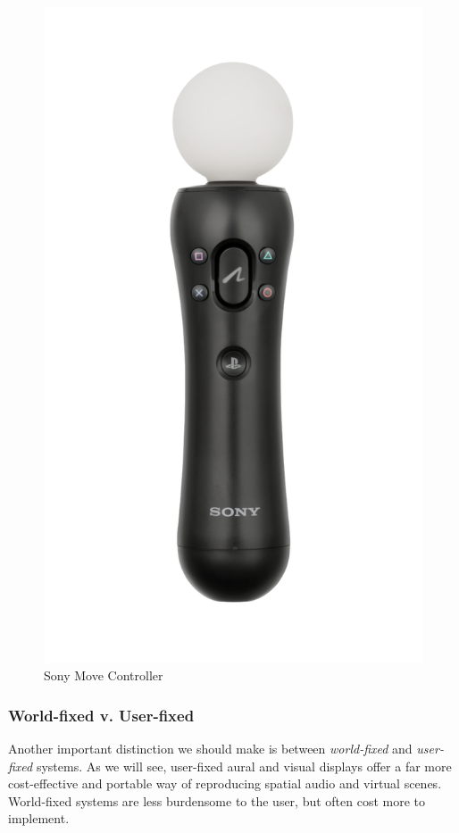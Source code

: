 \begin{figure}[!htb]
  \includegraphics[width=\linewidth]{img/sony-move.png}
  \caption{Sony Move Controller \cite{FileSony89online}}\label{fig:sony-move}
\endminipage
\end{figure}

\subsubsection{World-fixed v. User-fixed}

Another important distinction we should make is between \textit{world-fixed} and \textit{user-fixed} systems. As we will see, user-fixed aural and visual displays offer a far more cost-effective and portable way of reproducing spatial audio and virtual scenes. World-fixed systems are less burdensome to the user, but often cost more to implement.

